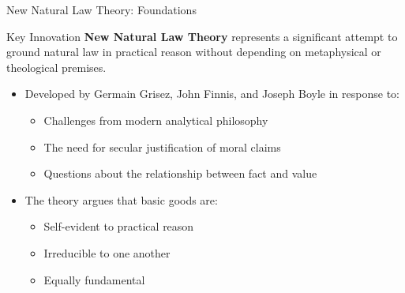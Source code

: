 \documentclass{beamer}
\begin{document}
\begin{frame}{New Natural Law Theory: Foundations}
    \begin{alertblock}{Key Innovation}
        \textbf{New Natural Law Theory} represents a significant attempt to ground natural law in practical reason without depending on metaphysical or theological premises.
    \end{alertblock}

    \begin{itemize}
        \item Developed by Germain Grisez, John Finnis, and Joseph Boyle in response to:
        \begin{itemize}
            \item Challenges from modern analytical philosophy
            \item The need for secular justification of moral claims
            \item Questions about the relationship between fact and value
        \end{itemize}
        
        \item The theory argues that basic goods are:
        \begin{itemize}
            \item Self-evident to practical reason
            \item Irreducible to one another
            \item Equally fundamental
        \end{itemize}
    \end{itemize}
\end{frame}
\end{document}
